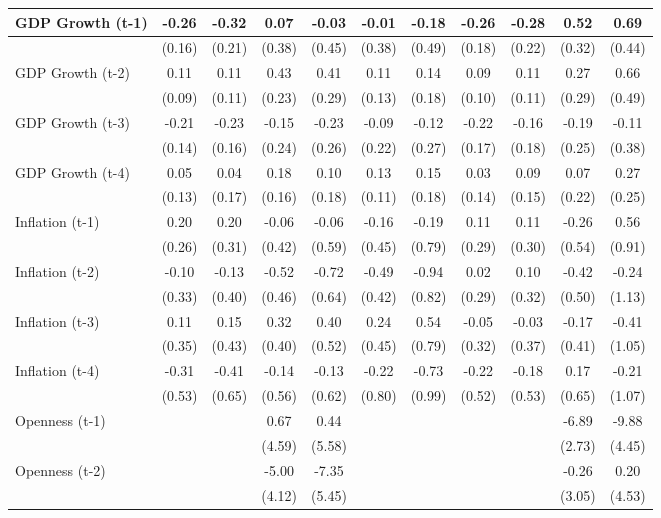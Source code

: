 \begin{tabular}{lcccccccccc}
\toprule
GDP Growth (t-1) & -0.26 & -0.32 & 0.07 & -0.03 & -0.01 & -0.18 & -0.26 & -0.28 & 0.52 & 0.69 \\
\midrule
& (0.16) & (0.21) & (0.38) & (0.45) & (0.38) & (0.49) & (0.18) & (0.22) & (0.32) & (0.44) \\
GDP Growth (t-2) & 0.11 & 0.11 & 0.43 & 0.41 & 0.11 & 0.14 & 0.09 & 0.11 & 0.27 & 0.66 \\
& (0.09) & (0.11) & (0.23) & (0.29) & (0.13) & (0.18) & (0.10) & (0.11) & (0.29) & (0.49) \\
GDP Growth (t-3) & -0.21 & -0.23 & -0.15 & -0.23 & -0.09 & -0.12 & -0.22 & -0.16 & -0.19 & -0.11 \\
& (0.14) & (0.16) & (0.24) & (0.26) & (0.22) & (0.27) & (0.17) & (0.18) & (0.25) & (0.38) \\
GDP Growth (t-4) & 0.05 & 0.04 & 0.18 & 0.10 & 0.13 & 0.15 & 0.03 & 0.09 & 0.07 & 0.27 \\
& (0.13) & (0.17) & (0.16) & (0.18) & (0.11) & (0.18) & (0.14) & (0.15) & (0.22) & (0.25) \\
Inflation (t-1) & 0.20 & 0.20 & -0.06 & -0.06 & -0.16 & -0.19 & 0.11 & 0.11 & -0.26 & 0.56 \\
& (0.26) & (0.31) & (0.42) & (0.59) & (0.45) & (0.79) & (0.29) & (0.30) & (0.54) & (0.91) \\
Inflation (t-2) & -0.10 & -0.13 & -0.52 & -0.72 & -0.49 & -0.94 & 0.02 & 0.10 & -0.42 & -0.24 \\
& (0.33) & (0.40) & (0.46) & (0.64) & (0.42) & (0.82) & (0.29) & (0.32) & (0.50) & (1.13) \\
Inflation (t-3) & 0.11 & 0.15 & 0.32 & 0.40 & 0.24 & 0.54 & -0.05 & -0.03 & -0.17 & -0.41 \\
& (0.35) & (0.43) & (0.40) & (0.52) & (0.45) & (0.79) & (0.32) & (0.37) & (0.41) & (1.05) \\
Inflation (t-4) & -0.31 & -0.41 & -0.14 & -0.13 & -0.22 & -0.73 & -0.22 & -0.18 & 0.17 & -0.21 \\
& (0.53) & (0.65) & (0.56) & (0.62) & (0.80) & (0.99) & (0.52) & (0.53) & (0.65) & (1.07) \\
Openness (t-1) &  &  & 0.67 & 0.44 &  &  &  &  & -6.89 & -9.88 \\
&  &  & (4.59) & (5.58) &  &  &  &  & (2.73) & (4.45) \\
Openness (t-2) &  &  & -5.00 & -7.35 &  &  &  &  & -0.26 & 0.20 \\
&  &  & (4.12) & (5.45) &  &  &  &  & (3.05) & (4.53) \\

\end{tabular}
